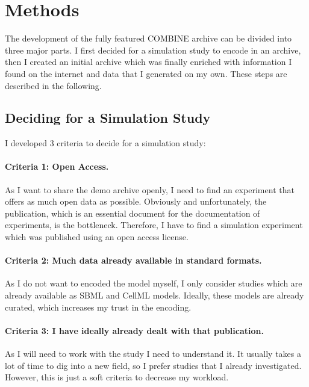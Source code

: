 
\section{Methods}

The development of the fully featured COMBINE archive can be divided into three major parts.
I first decided for a simulation study to encode in an archive, then I created an initial archive which was finally enriched with information I found on the internet and data that I generated on my own.
These steps are described in the following.

\subsection{Deciding for a Simulation Study}

I developed 3 criteria to decide for a simulation study:

\paragraph{Criteria 1: Open Access.}
As I want to share the demo archive openly, I need to find an experiment that offers as much open data as possible.
Obviously and unfortunately, the publication, which is an essential document for the documentation of experiments, is the bottleneck.
Therefore, I have to find a simulation experiment which was published using an open access license.

\paragraph{Criteria 2: Much data already available in standard formats.}
As I do not want to encoded the model myself, I only consider studies which are already available as SBML and CellML models.
Ideally, these models are already curated, which increases my trust in the encoding.

\paragraph{Criteria 3: I have ideally already dealt with that publication.}
As I will need to work with the study I need to understand it.
It usually takes a lot of time to dig into a new field, so I prefer studies that I already investigated.
However, this is just a soft criteria to decrease my workload.


